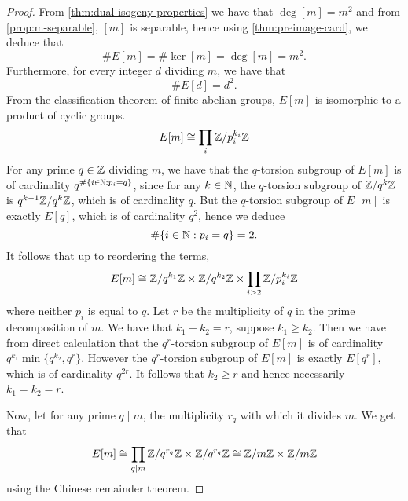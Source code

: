 \begin{proof}
	From \ref{thm:dual-isogeny-properties} we have that $\deg[m] = m^2$ and
	from \ref{prop:m-separable}, $[m]$ is separable, hence
	using \ref{thm:preimage-card}, we deduce that
	\begin{equation*}
		\#E[m] = \#\ker[m] = \deg[m] = m^2.
	\end{equation*}
	Furthermore, for every integer $d$ dividing $m$, we have that
	\begin{equation*}
		\#E[d] = d^2.
	\end{equation*}
	From the classification theorem of finite abelian groups, $E[m]$ is
	isomorphic to a product of cyclic groups.
	\begin{equation*}
		E[m] \cong \prod_{i} \mathbb{Z}/p_i^{k_i}\mathbb{Z}
	\end{equation*}
	For any prime $q \in \mathbb{Z}$ dividing $m$,
	we have that the $q$-torsion subgroup of $E[m]$
	is of cardinality $q^{\#\{i \in \mathbb{N} : p_i = q\}}$, since for any
	$k \in \mathbb{N}$, the $q$-torsion subgroup of $\mathbb{Z}/q^k\mathbb{Z}$ is
	$q^{k-1}\mathbb{Z}/q^k\mathbb{Z}$, which is of cardinality $q$.
	But the $q$-torsion subgroup of $E[m]$ is exactly $E[q]$, which is
	of cardinality $q^2$, hence we deduce
	\begin{equation*}
		\#\{i \in \mathbb{N}: p_i = q\} = 2.
	\end{equation*}
	It follows that up to reordering the terms,
	\begin{equation*}
		E[m] \cong \mathbb{Z}/q^{k_1}\mathbb{Z} \times \mathbb{Z}/q^{k_2}\mathbb{Z} \times 
		\prod_{i > 2}\mathbb{Z}/p_i^{k_i}\mathbb{Z}
	\end{equation*}
	where neither $p_i$ is equal to $q$. Let $r$ be the multiplicity of
	$q$ in the prime decomposition of $m$. We have that $k_1 + k_2 = r$,
	suppose $k_1 \geq k_2$. Then we have from direct calculation that
	the $q^r$-torsion subgroup of $E[m]$ is of cardinality
	$q^{k_1}\min\{q^{k_2}, q^{r}\}$.
	However the $q^r$-torsion subgroup of $E[m]$ is exactly $E[q^r]$, which
	is of cardinality $q^{2r}$.
	It follows that $k_2 \geq r$ and hence necessarily $k_1 = k_2 = r$.
	
	Now, let for any prime $q \mid m$, the multiplicity $r_q$ with which
	it divides $m$. We get that
	\begin{equation*}
		E[m] \cong \prod_{q \mid m}\mathbb{Z}/q^{r_q}\mathbb{Z}\times \mathbb{Z}/q^{r_q}\mathbb{Z}
		\cong \mathbb{Z}/m\mathbb{Z}\times \mathbb{Z}/m\mathbb{Z}
	\end{equation*}
	using the Chinese remainder theorem.
\end{proof}

